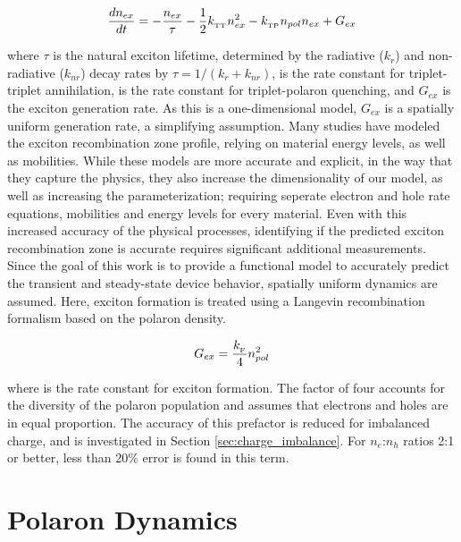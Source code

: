 \documentclass[../thesis.tex]{subfiles}
\begin{document}
\begin{equation}
\frac{dn_{ex}}{dt} = - \frac{n_{ex}}{\tau}-\frac{1}{2}k_{_\text{\tiny TT}} n_{ex}^2-k_{_\text{\tiny TP}} n_{pol}n_{ex}+G_{ex}
\label{eqn:exciton_rate}
\end{equation}

where $\tau$ is the natural exciton lifetime, determined by the radiative ($k_r$) and non-radiative ($k_{nr}$) decay rates by $\tau=1/(k_r+k_{nr})$, \ktt is the rate constant for triplet-triplet annihilation, \ktp is the rate constant for triplet-polaron quenching, and $G_{ex}$ is the exciton generation rate.  
As this is a one-dimensional model, $G_{ex}$ is a spatially uniform generation rate, a simplifying assumption.
Many studies have modeled the exciton recombination zone profile, relying on material energy levels, as well as mobilities.\supercite{Rihani2006,Hassine2001,Hassine2002,Ruhstaller2003,Ruhstaller2001}
While these models are more accurate and explicit, in the way that they capture the physics, they also increase the dimensionality of our model, as well as increasing the parameterization; requiring seperate electron and hole rate equations, mobilities and energy levels for every material.
Even with this increased accuracy of the physical processes, identifying if the predicted exciton recombination zone is accurate requires significant additional measurements.
Since the goal of this work is to provide a functional model to accurately predict the transient and steady-state device behavior, spatially uniform dynamics are assumed.
Here, exciton formation is treated using a Langevin recombination formalism based on the polaron density.\supercite{Ruhstaller2003,Pinner1999,Blom1996}

\begin{equation}
G_{ex}=\frac{k_{_\text{\tiny F}}}{4}n_{pol}^2
\label{eqn:exciton_formation}
\end{equation}

where \kf is the rate constant for exciton formation.  The factor of four accounts for the diversity of the polaron population and assumes that electrons and holes are in equal proportion.  
The accuracy of this prefactor is reduced for imbalanced charge, and is investigated in Section \ref{sec:charge_imbalance}.
For $n_e$:$n_h$ ratios 2:1 or better, less than 20\% error is found in this term.  

\section{Polaron Dynamics}
\end{document}
